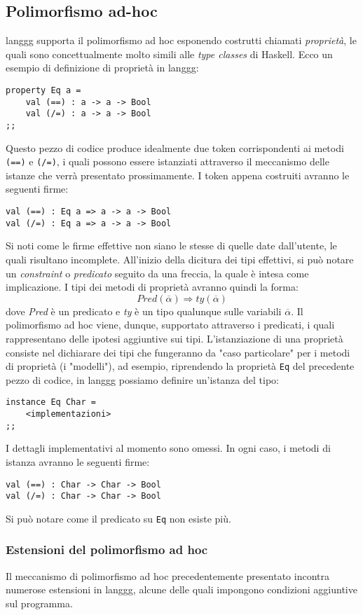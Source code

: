 \documentclass[10pt,a4paper]{article}
\begin{document}
\subsection{Polimorfismo ad-hoc}
langgg supporta il polimorfismo ad hoc esponendo costrutti chiamati \textit{proprietà}, le quali sono concettualmente
molto simili alle \textit{type classes} di Haskell. Ecco un esempio di definizione di proprietà in langgg:
\begin{lstlisting}
property Eq a =
    val (==) : a -> a -> Bool
    val (/=) : a -> a -> Bool
;;
\end{lstlisting}
Questo pezzo di codice produce idealmente due token corrispondenti ai metodi \texttt{(==)} e \texttt{(/=)},
i quali possono essere istanziati attraverso il meccanismo delle istanze che verrà presentato prossimamente. I token
appena costruiti avranno le seguenti firme:
\begin{lstlisting}
val (==) : Eq a => a -> a -> Bool
val (/=) : Eq a => a -> a -> Bool
\end{lstlisting}
Si noti come le firme effettive non siano le stesse di quelle date dall'utente, le quali risultano incomplete.
All'inizio della dicitura dei tipi effettivi, si può notare un \textit{constraint} o \textit{predicato} seguito da una
freccia, la quale è intesa come implicazione. I tipi dei metodi di proprietà avranno quindi la forma:
    \[ Pred(\overline{\alpha}) \Rightarrow ty(\overline{\alpha}) \]
dove \textit{Pred} è un predicato e \textit{ty} è un tipo qualunque sulle variabili $ \overline{\alpha} $.
Il polimorfismo ad hoc viene, dunque, supportato attraverso i predicati, i quali rappresentano delle ipotesi aggiuntive
sui tipi. L'istanziazione di una proprietà consiste nel dichiarare dei tipi che fungeranno da "caso particolare" per i
metodi di proprietà (i "modelli"), ad esempio, riprendendo la proprietà \texttt{Eq} del precedente pezzo di codice,
in langgg possiamo definire un'istanza del tipo:
\begin{lstlisting}
instance Eq Char =
    <implementazioni>
;;
\end{lstlisting}
I dettagli implementativi al momento sono omessi. In ogni caso, i metodi di istanza avranno le seguenti firme:
\begin{lstlisting}
val (==) : Char -> Char -> Bool
val (/=) : Char -> Char -> Bool
\end{lstlisting}
Si può notare come il predicato su \texttt{Eq} non esiste più.

\subsubsection{Estensioni del polimorfismo ad hoc}
Il meccanismo di polimorfismo ad hoc precedentemente presentato incontra numerose estensioni in langgg, alcune delle
quali impongono condizioni aggiuntive sul programma.
\end{document}
